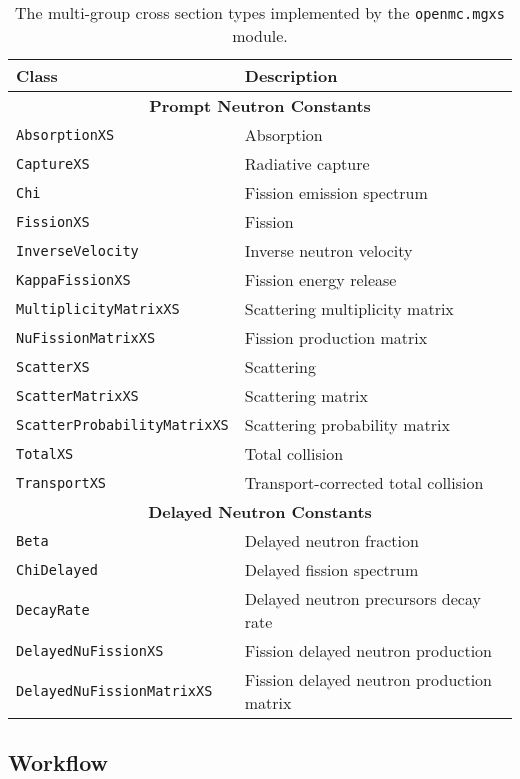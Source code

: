 \begin{table}[h!]
  \centering
  \caption{The multi-group cross section types implemented by the \texttt{openmc.mgxs} module.}
  \small
  \label{tab:mgxs-types}
  \vspace{6pt}
  \begin{tabular}{l l}
  \toprule
  \textbf{Class} &
  \textbf{Description} \\
  \midrule
  \multicolumn{2}{c}{\bf Prompt Neutron Constants} \\
  \midrule
  \texttt{AbsorptionXS} & Absorption \\
  \texttt{CaptureXS} & Radiative capture \\
  \texttt{Chi} & Fission emission spectrum \\
  \texttt{FissionXS} & Fission \\
  \texttt{InverseVelocity} & Inverse neutron velocity \\
  \texttt{KappaFissionXS} & Fission energy release \\
  \texttt{MultiplicityMatrixXS} & Scattering multiplicity matrix \\
  \texttt{NuFissionMatrixXS} & Fission production matrix \\
  \texttt{ScatterXS} & Scattering \\
  \texttt{ScatterMatrixXS} & Scattering matrix \\
  \texttt{ScatterProbabilityMatrixXS} & Scattering probability matrix \\
  \texttt{TotalXS} & Total collision \\
  \texttt{TransportXS} & Transport-corrected total collision \\
  \midrule
  \multicolumn{2}{c}{\bf Delayed Neutron Constants} \\
  \midrule
  \texttt{Beta} & Delayed neutron fraction \\
  \texttt{ChiDelayed} & Delayed fission spectrum \\
  \texttt{DecayRate} & Delayed neutron precursors decay rate \\
  \texttt{DelayedNuFissionXS} & Fission delayed neutron production \\
  \texttt{DelayedNuFissionMatrixXS} & Fission delayed neutron production matrix \\
  \bottomrule
\end{tabular}
\end{table}


\subsection{Workflow}
\label{subsec:workflow}

